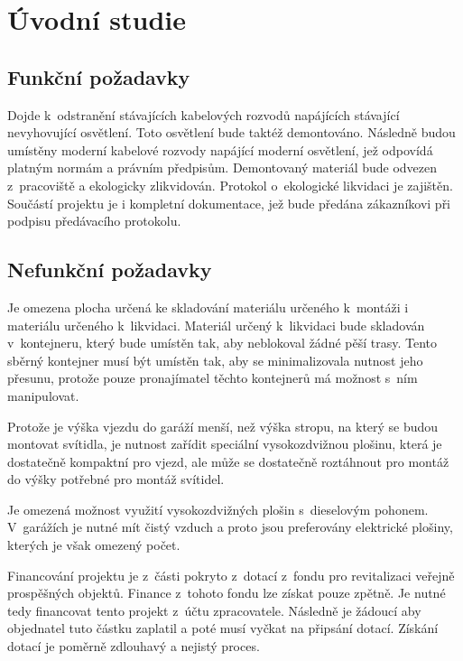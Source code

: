 \documentclass[a4paper, twoside, 11pt]{article}
\begin{document}
	
\section{Úvodní studie}
	\subsection{Funkční požadavky}
		Dojde k~odstranění stávajících kabelových rozvodů napájících stávající nevyhovující osvětlení. Toto osvětlení bude taktéž demontováno. Následně budou umístěny moderní kabelové rozvody napájící moderní osvětlení, jež odpovídá platným normám a právním předpisům. Demontovaný materiál bude odvezen z~pracoviště a ekologicky zlikvidován. Protokol o~ekologické likvidaci je zajištěn. Součástí projektu je i kompletní dokumentace, jež bude předána zákazníkovi při podpisu předávacího protokolu.
	\subsection{Nefunkční požadavky}
		Je omezena plocha určená ke skladování materiálu určeného k~montáži i materiálu určeného k~likvidaci. Materiál určený k~likvidaci bude skladován v~kontejneru, který bude umístěn tak, aby neblokoval žádné pěší trasy. Tento sběrný kontejner musí být umístěn tak, aby se minimalizovala nutnost jeho přesunu, protože pouze pronajímatel těchto kontejnerů má možnost s~ním manipulovat.\par
		Protože je výška vjezdu do garáží menší, než výška stropu, na který se budou montovat svítidla, je nutnost zařídit speciální vysokozdvižnou plošinu, která je dostatečně kompaktní pro vjezd, ale může se dostatečně roztáhnout pro montáž do výšky potřebné pro montáž svítidel.\par
		Je omezená možnost využití vysokozdvižných plošin s~dieselovým pohonem. V~garážích je nutné mít čistý vzduch a proto jsou preferovány elektrické plošiny, kterých je však omezený počet.\par
		Financování projektu je z~části pokryto z~dotací z~fondu pro revitalizaci veřejně prospěšných objektů. Finance z~tohoto fondu lze získat pouze zpětně. Je nutné tedy financovat tento projekt z~účtu zpracovatele. Následně je žádoucí aby objednatel tuto částku zaplatil a poté musí vyčkat na připsání dotací. Získání dotací je poměrně zdlouhavý a nejistý proces. \par
		
\end{document}
